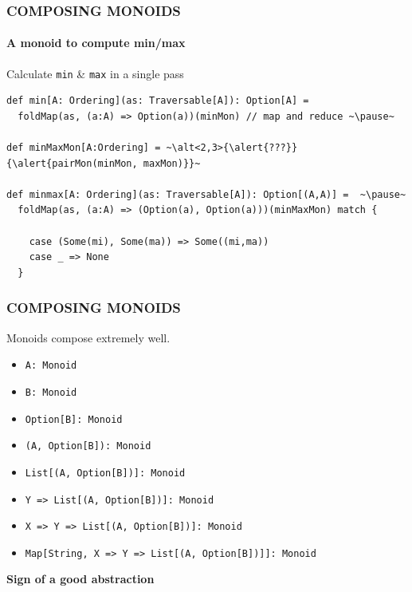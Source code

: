 \documentclass{beamer}
\begin{document}
\begin{frame}[fragile] \frametitle{COMPOSING MONOIDS}
  \framesubtitle{A monoid to compute min/max}
  \begin{block}{Calculate \texttt{min} \& \texttt{max} in a \alert{single pass}}
  \begin{lstlisting}
def min[A: Ordering](as: Traversable[A]): Option[A] =
  foldMap(as, (a:A) => Option(a))(minMon) // map and reduce ~\pause~

def minMaxMon[A:Ordering] = ~\alt<2,3>{\alert{???}}{\alert{pairMon(minMon, maxMon)}}~

def minmax[A: Ordering](as: Traversable[A]): Option[(A,A)] =  ~\pause~
  foldMap(as, (a:A) => (Option(a), Option(a)))(minMaxMon) match {

    case (Some(mi), Some(ma)) => Some((mi,ma))
    case _ => None
  }
  \end{lstlisting}
  \end{block}

\end{frame}

\begin{frame} \frametitle{COMPOSING MONOIDS}
  Monoids compose extremely well.
  \begin{itemize}
    \item \texttt{A: Monoid}
    \item \texttt{B: Monoid}
      \pause
    \item \texttt{Option[B]: Monoid}
      \pause
    \item \texttt{(A, Option[B]): Monoid}
    \item \texttt{List[(A, Option[B])]: Monoid}
      \pause
    \item \texttt{Y => List[(A, Option[B])]: Monoid}
      \pause
    \item \texttt{X => Y => List[(A, Option[B])]: Monoid}
    \item \texttt{Map[String, X => Y => List[(A, Option[B])]]: Monoid}
  \end{itemize}
  \begin{block}{}
    \centering
    \Large \textbf{Sign of a good abstraction}
  \end{block}
\end{frame}
\end{document}
